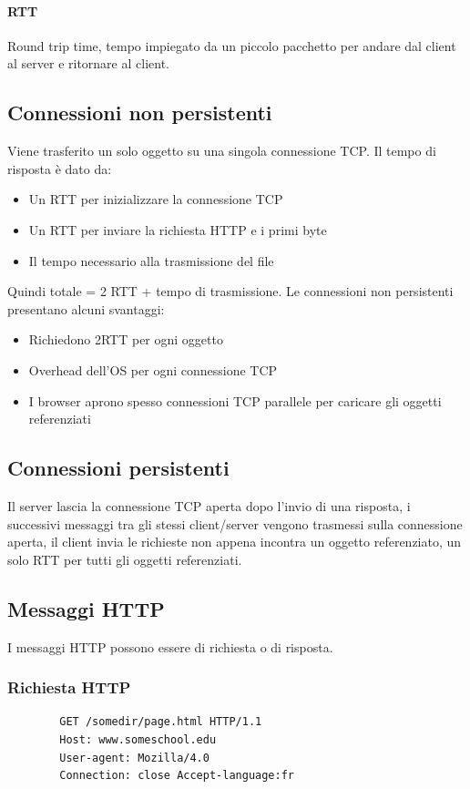 \documentclass{report}
\begin{document}
	\paragraph{RTT} Round trip time, tempo impiegato da un piccolo pacchetto per andare dal client al server e ritornare al client.
	\subsection{Connessioni non persistenti}
	Viene trasferito un solo oggetto su una singola connessione TCP. Il tempo di risposta è dato da:
	\begin{itemize}
		\item Un RTT per inizializzare la connessione TCP
		\item Un RTT per inviare la richiesta HTTP e i primi byte
		\item Il tempo necessario alla trasmissione del file
	\end{itemize}
	Quindi totale = 2 RTT + tempo di trasmissione. Le connessioni non persistenti presentano alcuni svantaggi:
	\begin{itemize}
		\item Richiedono 2RTT per ogni oggetto
		\item Overhead dell'OS per ogni connessione TCP
		\item I browser aprono spesso connessioni TCP parallele per caricare gli oggetti referenziati
	\end{itemize}
	\subsection{Connessioni persistenti}
	Il server lascia la connessione TCP aperta dopo l'invio di una risposta, i successivi messaggi tra gli stessi client/server vengono trasmessi sulla connessione aperta, il client invia le richieste non appena incontra un oggetto referenziato, un solo RTT per tutti gli oggetti referenziati.
	\subsection{Messaggi HTTP}
	I messaggi HTTP possono essere di richiesta o di risposta.
	\subsubsection{Richiesta HTTP}
	\begin{verbatim}
		GET /somedir/page.html HTTP/1.1
		Host: www.someschool.edu
		User-agent: Mozilla/4.0
		Connection: close Accept-language:fr
	\end{verbatim}
\end{document}
